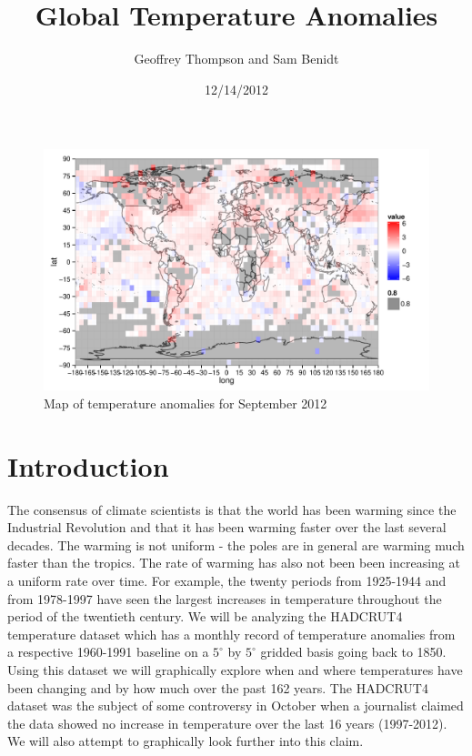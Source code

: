 \documentclass{article}\usepackage{graphicx, color}
\title{Global Temperature Anomalies}
\author{Geoffrey Thompson and Sam Benidt}
\date{12/14/2012}
\newenvironment{knitrout}{}{} %
\begin{document}
\maketitle




\begin{figure}[H]
\begin{knitrout}
\color{fgcolor}\includegraphics[width=\linewidth]{figure/recent-map} 
\end{knitrout}

\caption{\label{sep2012map}Map of temperature anomalies for September 2012}
\end{figure}

\section{Introduction}

The consensus of climate scientists is that the world has been warming since the Industrial Revolution and that it has been warming faster over the last several decades. The warming is not uniform - the poles are in general are warming much faster than the tropics. The rate of warming has also not been been increasing at a uniform rate over time. For example, the twenty periods from 1925-1944 and from 1978-1997 have seen the largest increases in temperature throughout the period of the twentieth century. We will be analyzing the HADCRUT4 temperature dataset which has a monthly record of temperature anomalies from a respective 1960-1991 baseline on a $5^{\circ}$ by $5^{\circ}$ gridded basis going back to 1850.  Using this dataset we will graphically explore when and where temperatures have been changing and by how much over the past 162 years. The HADCRUT4 dataset was the subject of some controversy in October when a journalist claimed the data showed no increase in temperature over the last 16 years (1997-2012). We will also attempt to graphically look further into this claim.
\end{document}
